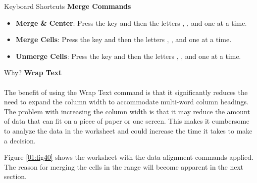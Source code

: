 \begin{center}
	\begin{shtcutbox}{Keyboard Shortcuts}
		\textbf{Merge Commands}
		\\
		\begin{itemize}
			\setlength{\itemsep}{0pt}
			\setlength{\parskip}{0pt}
			\setlength{\parsep}{0pt}
			
			\item \textbf{Merge \& Center}: Press the  key and then the letters , , and  one at a time.
			\item \textbf{Merge Cells}: Press the  key and then the letters , , and  one at a time.
			\item \textbf{Unmerge Cells}: Press the  key and then the letters , , and  one at a time.
			
		\end{itemize}
	\end{shtcutbox}
\end{center}

\begin{center}
	\begin{infobox}{Why?}
		\textbf{Wrap Text}
		\\
		\\
		The benefit of using the Wrap Text command is that it significantly reduces the need to expand the column width to accommodate multi-word column headings. The problem with increasing the column width is that it may reduce the amount of data that can fit on a piece of paper or one screen. This makes it cumbersome to analyze the data in the worksheet and could increase the time it takes to make a decision.
	\end{infobox}
\end{center}

Figure \ref{01:fig40} shows the  worksheet with the data alignment commands applied. The reason for merging the cells in the range  will become apparent in the next section.

